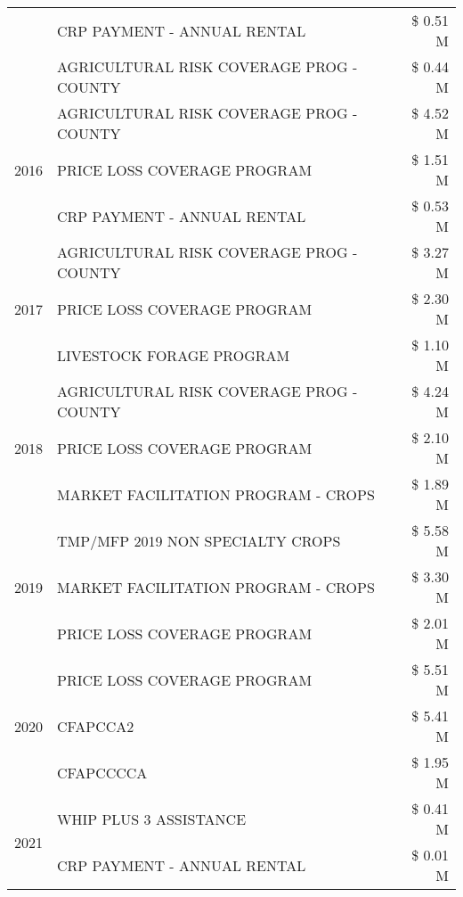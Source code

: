 \begin{tabular}{llr}
 & CRP PAYMENT - ANNUAL RENTAL & \$ 0.51 M \\
 & AGRICULTURAL RISK COVERAGE PROG - COUNTY & \$ 0.44 M \\
\cline{1-3}
\multirow[t]{3}{*}{2016} & AGRICULTURAL RISK COVERAGE PROG - COUNTY & \$ 4.52 M \\
 & PRICE LOSS COVERAGE PROGRAM & \$ 1.51 M \\
 & CRP PAYMENT - ANNUAL RENTAL & \$ 0.53 M \\
\cline{1-3}
\multirow[t]{3}{*}{2017} & AGRICULTURAL RISK COVERAGE PROG - COUNTY & \$ 3.27 M \\
 & PRICE LOSS COVERAGE PROGRAM & \$ 2.30 M \\
 & LIVESTOCK FORAGE PROGRAM & \$ 1.10 M \\
\cline{1-3}
\multirow[t]{3}{*}{2018} & AGRICULTURAL RISK COVERAGE PROG - COUNTY & \$ 4.24 M \\
 & PRICE LOSS COVERAGE PROGRAM & \$ 2.10 M \\
 & MARKET FACILITATION PROGRAM - CROPS & \$ 1.89 M \\
\cline{1-3}
\multirow[t]{3}{*}{2019} & TMP/MFP 2019 NON SPECIALTY CROPS & \$ 5.58 M \\
 & MARKET FACILITATION PROGRAM - CROPS & \$ 3.30 M \\
 & PRICE LOSS COVERAGE PROGRAM & \$ 2.01 M \\
\cline{1-3}
\multirow[t]{3}{*}{2020} & PRICE LOSS COVERAGE PROGRAM & \$ 5.51 M \\
 & CFAPCCA2 & \$ 5.41 M \\
 & CFAPCCCCA & \$ 1.95 M \\
\cline{1-3}
\multirow[t]{2}{*}{2021} & WHIP PLUS 3 ASSISTANCE & \$ 0.41 M \\
 & CRP PAYMENT - ANNUAL RENTAL & \$ 0.01 M \\
\cline{1-3}
\bottomrule
\end{tabular}
